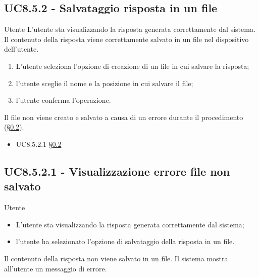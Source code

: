 \subsection{UC8.5.2 - Salvataggio risposta in un file}
\label{8.5.2}
\makeUC{}
{Utente}
{L'utente sta visualizzando la risposta generata correttamente dal sistema.}
{Il contenuto della risposta viene correttamente salvato in un file nel dispositivo dell'utente.}
{
    \begin{enumerate}
        \item L'utente seleziona l'opzione di creazione di un file in cui salvare la risposta;
        \item l'utente sceglie il nome e la posizione in cui salvare il file;
        \item l'utente conferma l'operazione.
    \end{enumerate}
}{}{
    Il file non viene creato e salvato a causa di un errore durante il procedimento (§\ref{8.5.2.1}).
}{
    \begin{itemize}
        \item UC8.5.2.1 §\ref{8.5.2.1}
    \end{itemize}
}{}

\subsection{UC8.5.2.1 - Visualizzazione errore file non salvato}
\label{8.5.2.1}
\makeUC{}
{Utente}
{
    \begin{itemize}
        \item L'utente sta visualizzando la risposta generata correttamente dal sistema;
        \item l'utente ha selezionato l'opzione di salvataggio della risposta in un file.
    \end{itemize}
}
{Il contenuto della risposta non viene salvato in un file.}
{Il sistema mostra all'utente un messaggio di errore.}{}{}{}{}

